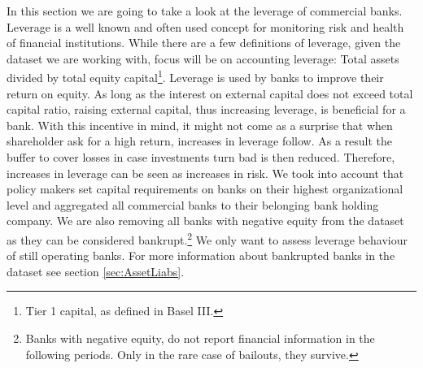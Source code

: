\documentclass[12pt, a4paper]{article} %
\begin{document}
In this section we are going to take a look at the leverage of commercial banks. Leverage is a well known and often used concept for monitoring risk and health of financial institutions. While there are a few definitions of leverage, given the dataset we are working with, focus will be on accounting leverage: Total assets divided by total equity capital\footnote{Tier 1 capital, as defined in Basel III.}. Leverage is used by banks to improve their return on equity. As long as the interest on external capital does not exceed total capital ratio, raising external capital, thus increasing leverage, is beneficial for a bank. With this incentive in mind, it might not come as a surprise that when shareholder ask for a high return, increases in leverage follow. As a result the buffer to cover losses in case investments turn bad is then reduced. Therefore, increases in leverage can be seen as increases in risk.
We took into account that policy makers set capital requirements on banks on their highest organizational level and aggregated all commercial banks to their belonging bank holding company. 
We are also removing all banks with negative equity from the dataset as they can be considered bankrupt.\footnote{Banks with negative equity, do not report financial information in the following periods. Only in the rare case of bailouts, they survive.} We only want to assess leverage behaviour of still operating banks. For more information about bankrupted banks in the dataset see section \ref{sec:AssetLiabs}. 
\end{document}
